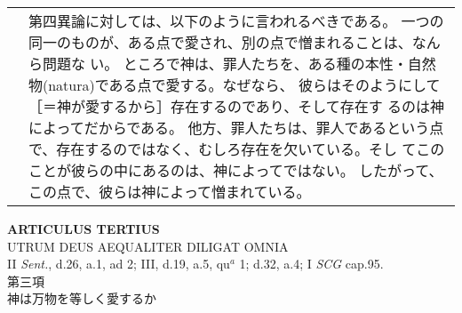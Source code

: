 \documentclass[10pt]{jsarticle} %
\begin{document}
\begin{longtable}{p{21em}p{21em}}
&


第四異論に対しては、以下のように言われるべきである。
一つの同一のものが、ある点で愛され、別の点で憎まれることは、なんら問題な
 い。
ところで神は、罪人たちを、ある種の本性・自然物(natura)である点で愛する。なぜなら、
 彼らはそのようにして［＝神が愛するから］存在するのであり、そして存在す
 るのは神によってだからである。
他方、罪人たちは、罪人であるという点で、存在するのではなく、むしろ存在を欠いている。そし
 てこのことが彼らの中にあるのは、神によってではない。
したがって、この点で、彼らは神によって憎まれている。




\end{longtable}
\newpage


\begin{center}
 {\Large {\bf ARTICULUS TERTIUS}}\\
 {\large UTRUM DEUS AEQUALITER DILIGAT OMNIA}\\
 {\footnotesize II {\itshape Sent.}, d.26, a.1, ad 2; III, d.19, a.5,
 qu$^a$ 1; d.32, a.4; I {\itshape SCG} cap.95.}\\
 {\Large 第三項\\神は万物を等しく愛するか}
\end{center}
\end{document}
